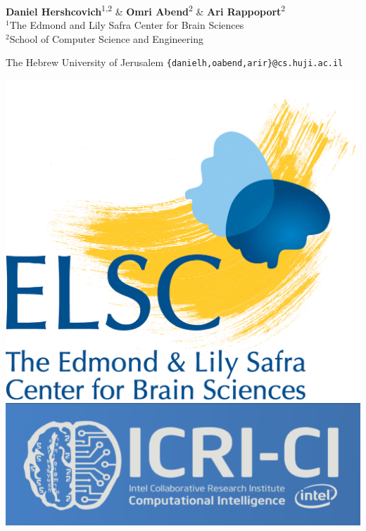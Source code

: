 \documentclass[a0,portrait]{a0poster}
\begin{document}
\hspace{1cm}
\begin{minipage}[b]{0.57\linewidth}
\LARGE \textbf{Daniel Hershcovich}\textsuperscript{1,2} \&
	   \textbf{Omri Abend}\textsuperscript{2} \&
	   \textbf{Ari Rappoport}\textsuperscript{2} \\[0.5cm] %
\Large $^1$The Edmond and Lily Safra Center for Brain Sciences \\
  $^2$School of Computer Science and Engineering
  \setlength{\columnseprule}{0pt}
  \setlength\multicolsep{-20pt}
  \begin{multicols}{2}
  The Hebrew University of Jerusalem
  \large \texttt{\{danielh,oabend,arir\}@cs.huji.ac.il}
  \end{multicols}
\end{minipage}
\hfill
\begin{minipage}[b]{.09\linewidth}
\includegraphics[width=\linewidth]{elsc_logo.png}\vspace{5mm}
\includegraphics[width=\linewidth]{icrici_banner.png}
\end{minipage}
\end{document}

